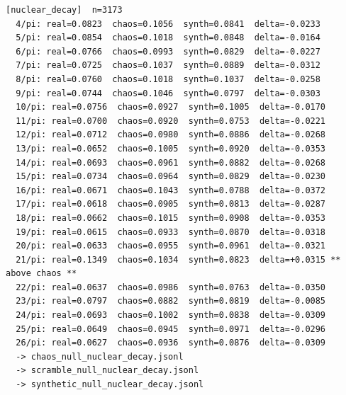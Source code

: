 \documentclass[11pt, letterpaper, openany]{book}
\begin{document}
\begin{empiricalbox}
\begin{lstlisting}[style=terminal]
[nuclear_decay]  n=3173
  4/pi: real=0.0823  chaos=0.1056  synth=0.0841  delta=-0.0233
  5/pi: real=0.0854  chaos=0.1018  synth=0.0848  delta=-0.0164
  6/pi: real=0.0766  chaos=0.0993  synth=0.0829  delta=-0.0227
  7/pi: real=0.0725  chaos=0.1037  synth=0.0889  delta=-0.0312
  8/pi: real=0.0760  chaos=0.1018  synth=0.1037  delta=-0.0258
  9/pi: real=0.0744  chaos=0.1046  synth=0.0797  delta=-0.0303
  10/pi: real=0.0756  chaos=0.0927  synth=0.1005  delta=-0.0170
  11/pi: real=0.0700  chaos=0.0920  synth=0.0753  delta=-0.0221
  12/pi: real=0.0712  chaos=0.0980  synth=0.0886  delta=-0.0268
  13/pi: real=0.0652  chaos=0.1005  synth=0.0920  delta=-0.0353
  14/pi: real=0.0693  chaos=0.0961  synth=0.0882  delta=-0.0268
  15/pi: real=0.0734  chaos=0.0964  synth=0.0829  delta=-0.0230
  16/pi: real=0.0671  chaos=0.1043  synth=0.0788  delta=-0.0372
  17/pi: real=0.0618  chaos=0.0905  synth=0.0813  delta=-0.0287
  18/pi: real=0.0662  chaos=0.1015  synth=0.0908  delta=-0.0353
  19/pi: real=0.0615  chaos=0.0933  synth=0.0870  delta=-0.0318
  20/pi: real=0.0633  chaos=0.0955  synth=0.0961  delta=-0.0321
  21/pi: real=0.1349  chaos=0.1034  synth=0.0823  delta=+0.0315 ** above chaos **
  22/pi: real=0.0637  chaos=0.0986  synth=0.0763  delta=-0.0350
  23/pi: real=0.0797  chaos=0.0882  synth=0.0819  delta=-0.0085
  24/pi: real=0.0693  chaos=0.1002  synth=0.0838  delta=-0.0309
  25/pi: real=0.0649  chaos=0.0945  synth=0.0971  delta=-0.0296
  26/pi: real=0.0627  chaos=0.0936  synth=0.0876  delta=-0.0309
  -> chaos_null_nuclear_decay.jsonl
  -> scramble_null_nuclear_decay.jsonl
  -> synthetic_null_nuclear_decay.jsonl


\end{lstlisting}
\end{empiricalbox}
\end{document}
